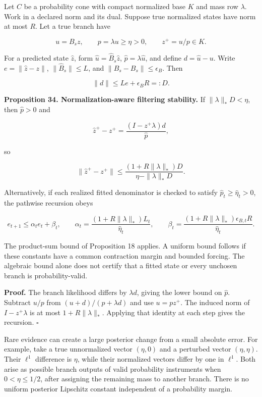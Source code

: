 Let \(C\) be a probability cone with compact normalized base \(K\) and
mass row \(\lambda\). Work in a declared norm and its dual. Suppose true
normalized states have norm at most \(R\). Let a true branch have

\[
u=B_sz,\qquad p=\lambda u\geq\eta>0,\qquad z^+=u/p\in K.
\]

For a predicted state \(\widehat z\), form
\(\widehat u=\widehat B_s\widehat z\), \(\widehat p=\lambda\widehat u\),
and define \(d=\widehat u-u\). Write \(e=\|\widehat z-z\|\),
\(\|\widehat B_s\|\leq L\), and \(\|\widehat B_s-B_s\|\leq\epsilon_B\).
Then

\[
\|d\|\leq Le+\epsilon_BR=:D.
\]

\textbf{Proposition 34. Normalization-aware filtering stability.} If
\(\|\lambda\|_*D<\eta\), then \(\widehat p>0\) and

\[
\widehat z^+-z^+
=\frac{(I-z^+\lambda)d}{\widehat p},
\]

so

\[
\boxed{
\|\widehat z^+-z^+\|
\leq\frac{(1+R\|\lambda\|_*)D}{\eta-\|\lambda\|_*D}.
}
\]

Alternatively, if each realized fitted denominator is checked to satisfy
\(\widehat p_t\geq\widehat\eta_t>0\), the pathwise recursion obeys

\[
e_{t+1}\leq\alpha_te_t+\beta_t,\qquad
\alpha_t=\frac{(1+R\|\lambda\|_*)L_t}{\widehat\eta_t},\qquad
\beta_t=\frac{(1+R\|\lambda\|_*)\epsilon_{B,t}R}{\widehat\eta_t}.
\]

The product-sum bound of Proposition 18 applies. A uniform bound follows
if these constants have a common contraction margin and bounded forcing.
The algebraic bound alone does not certify that a fitted state or every
unchosen branch is probability-valid.

\textbf{Proof.} The branch likelihood differs by \(\lambda d\), giving
the lower bound on \(\widehat p\). Subtract \(u/p\) from
\((u+d)/(p+\lambda d)\) and use \(u=pz^+\). The induced norm of
\(I-z^+\lambda\) is at most \(1+R\|\lambda\|_*\). Applying that identity
at each step gives the recursion. \(\square\)

Rare evidence can create a large posterior change from a small absolute
error. For example, take a true unnormalized vector \((\eta,0)\) and a
perturbed vector \((\eta,\eta)\). Their \(\ell^1\) difference is
\(\eta\), while their normalized vectors differ by one in \(\ell^1\).
Both arise as possible branch outputs of valid probability instruments
when \(0<\eta\leq1/2\), after assigning the remaining mass to another
branch. There is no uniform posterior Lipschitz constant independent of
a probability margin.

